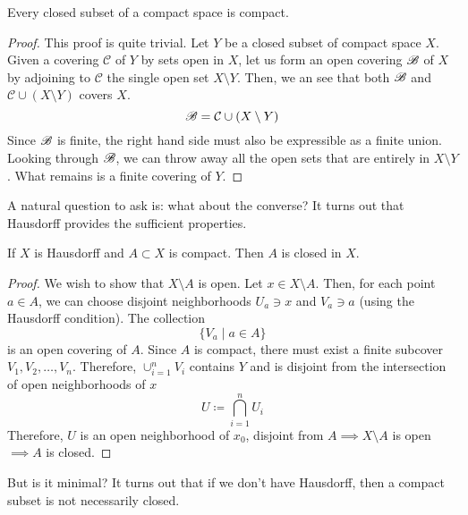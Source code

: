   \begin{theorem}
    Every closed subset of a compact space is compact. 
  \end{theorem}
  \begin{proof}
    This proof is quite trivial. Let $Y$ be a closed subset of compact space $X$. Given a covering $\mathcal{C}$ of $Y$ by sets open in $X$, let us form an open covering $\operatorname{\mathscr{B}}$ of $X$ by adjoining to $\mathcal{C}$ the single open set $X \setminus Y$. Then, we an see that both $\operatorname{\mathscr{B}}$ and $\mathcal{C} \cup (X \setminus Y)$ covers $X$. 
    \begin{equation}
      \operatorname{\mathscr{B}} = \mathcal{C} \cup (X \setminus Y)
    \end{equation}
    Since $\operatorname{\mathscr{B}}$ is finite, the right hand side must also be expressible as a finite union. Looking through $\operatorname{\mathscr{B}}$, we can throw away all the open sets that are entirely in $X \setminus Y$. What remains is a finite covering of $Y$. 
  \end{proof}

  A natural question to ask is: what about the converse? It turns out that Hausdorff provides the sufficient properties. 

  \begin{theorem}
    If $X$ is Hausdorff and $A \subset X$ is compact. Then $A$ is closed in $X$. 
  \end{theorem}
  \begin{proof}
    We wish to show that $X \setminus A$ is open. Let $x \in X \setminus A$. Then, for each point $a \in A$, we can choose disjoint neighborhoods $U_a \ni x$ and $V_a \ni a$ (using the Hausdorff condition). The collection 
    \begin{equation}
      \{V_a \mid a \in A\}
    \end{equation}
    is an open covering of $A$. Since $A$ is compact, there must exist a finite subcover $V_1, V_2, \ldots , V_n$. Therefore, $\cup_{i=1}^{n} V_i$ contains $Y$ and is disjoint from the intersection of open neighborhoods of $x$
    \begin{equation}
      U \coloneqq \bigcap_{i=1}^n U_i
    \end{equation}
    Therefore, $U$ is an open neighborhood of $x_0$, disjoint from $A \implies X \setminus A$ is open $\implies A$ is closed.
  \end{proof}

  But is it minimal? It turns out that if we don't have Hausdorff, then a compact subset is not necessarily closed. 

